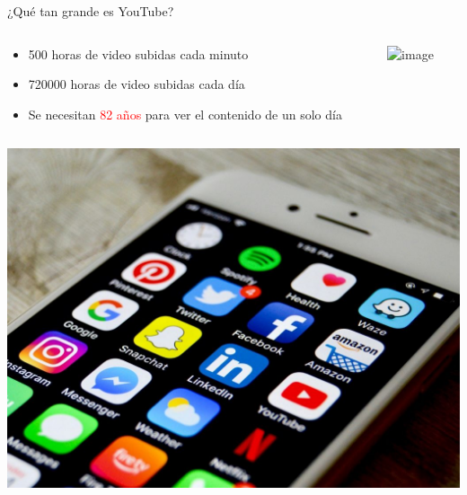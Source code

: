 \begin{frame}{¿Qu\'e tan grande es YouTube?}

    \begin{columns}[T]
        \begin{column}{0.48\textwidth}
            \begin{overlayarea}{\linewidth}{\textheight}
                \vspace{17mm}

                \begin{itemize}
                    \item<1-> 500 horas de video subidas cada minuto
                    \item<2-> 720000 horas de video subidas cada d\'ia
                    \item<3-> Se necesitan \textcolor{red}{82 a\~nos} para ver el contenido de un solo d\'ia
                \end{itemize}
            \end{overlayarea}

        \end{column}

        \begin{column}{0.48\textwidth}
            \vspace{17mm}
            
            \includegraphics<3->[width=\textwidth]{img/skelly.jpg}
        \end{column}
    \end{columns}
\end{frame}

{
{
    \includegraphics[width=\paperwidth,height=\paperheight]{img/Big-tech-banking-LatAm.jpg}
}
\begin{frame}
\end{frame}
}
